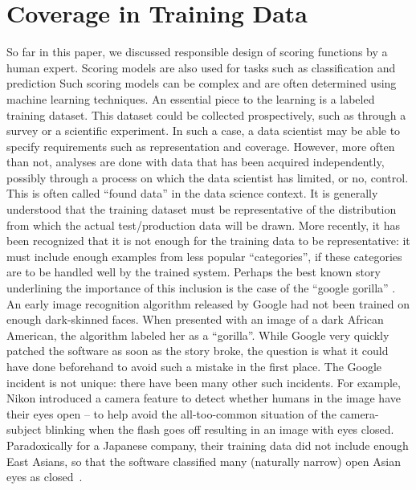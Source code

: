 \vspace{-3mm}
\section{Coverage in Training Data}\label{sec:coverage} %
\vspace{-3mm}
So far in this paper, we discussed responsible design of scoring functions by a human expert.
Scoring models are also used for tasks such as classification and prediction
Such scoring models can be complex and are often determined using machine learning techniques. An essential piece to the learning is a labeled training dataset.
This dataset could be collected prospectively, such as through a survey or a scientific experiment. In such a case, a data scientist may be able to specify requirements such as representation and coverage.
However, more often than not, analyses are done with data that has been acquired independently, possibly through a process on which the data scientist has limited, or no, control. This is often called ``found data'' in the data science context.
It is generally understood that the training dataset must be representative of the distribution from which the actual test/production data will be drawn.  More recently, it has been recognized that it is not enough for the training data to be representative: it must include enough examples from less popular ``categories'', if these categories are to be handled well by the trained system.  Perhaps the best known story underlining the importance of this inclusion is the case of the ``google gorilla'' \cite{google-gorilla}.  An early image recognition algorithm released by Google had not been trained on enough dark-skinned faces.  When presented with an image of a dark African American, the algorithm labeled her as a ``gorilla''.  While Google very quickly patched the software as soon as the story broke, the question is what it could have done beforehand to avoid such a mistake in the first place.
The Google incident is not unique: there have been many other such incidents.
For example, Nikon introduced a camera feature to detect whether humans in the image have their eyes open -- to help avoid the all-too-common situation of the camera-subject blinking when the flash goes off resulting in an image with eyes closed.  Paradoxically for a Japanese company, their training data did not include enough East Asians, so that the software classified many (naturally narrow) open Asian eyes as closed~\cite{closed-eyes}.

